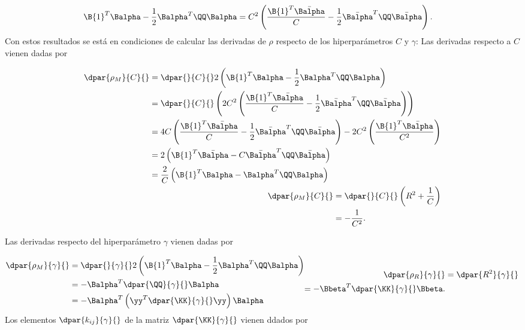 \begin{align}
\label{eq:rmb-alpha-equiv}
  \B{1}^T\Balpha-\frac{1}{2}\Balpha^T\QQ\Balpha
  &= C^2\left(\frac{\B{1}^T\bar{\Balpha}}{C} -
  \frac{1}{2}\bar{\Balpha}^T\QQ\bar{\Balpha}\right).
\end{align}
Con estos resultados se está en condiciones de calcular las derivadas de
$\rho$ respecto de los hiperparámetros $C$ y $\gamma$:
Las derivadas respecto a $C$ vienen dadas por

\begin{align}
  \begin{aligned}
    \dpar{\rho_M}{C}{}
    &= \dpar{}{C}{}2\left(  \B{1}^T\Balpha-\frac{1}{2}\Balpha^T\QQ\Balpha \right) \\
    &= \dpar{}{C}{}\left( 2C^2\left(\frac{\B{1}^T\bar{\Balpha}}{C} -
    \frac{1}{2}\bar{\Balpha}^T\QQ\bar{\Balpha}\right)
    \right) \\
    &= 4C \left(\frac{\B{1}^T\bar{\Balpha}}{C} -
    \frac{1}{2}\bar{\Balpha}^T\QQ\bar{\Balpha}\right) - 2C^2 \left(\frac{\B{1}^T\bar{\Balpha}}{C^2} \right) \\
    &= 2\left(\B{1}^T\bar{\Balpha} - C \bar{\Balpha}^T\QQ\bar{\Balpha}\right) \\
    &= \frac{2}{C} \left(\B{1}^T\Balpha - \Balpha^T\QQ\Balpha\right)
  \end{aligned}
  \\
  \begin{aligned}
    \dpar{\rho_M}{C}{}
    &= \dpar{}{C}{} \left( R^2 + \frac{1}{C} \right) \\
    &= -\frac{1}{C^2}.
  \end{aligned}
\end{align}

Las derivadas respecto del hiperparámetro $\gamma$ vienen dadas por

\begin{align}
  \begin{aligned}
    \dpar{\rho_M}{\gamma}{}
    &= \dpar{}{\gamma}{} 2\left(  \B{1}^T\Balpha-\frac{1}{2}\Balpha^T\QQ\Balpha \right) \\
    &= - \Balpha^T \dpar{\QQ}{\gamma}{}\Balpha \\
    & = - \Balpha^T \left(\yy^T \dpar{\KK}{\gamma}{}\yy\right) \Balpha
  \end{aligned}
  \begin{aligned}
    \dpar{\rho_R}{\gamma}{} &= \dpar{R^2}{\gamma}{} \\
    = - \Bbeta^T \dpar{\KK}{\gamma}{} \Bbeta. %
  \end{aligned}
\end{align}
Los elementos $\dpar{k_{ij}}{\gamma}{}$ de la matriz $\dpar{\KK}{\gamma}{}$ 
vienen ddados por

